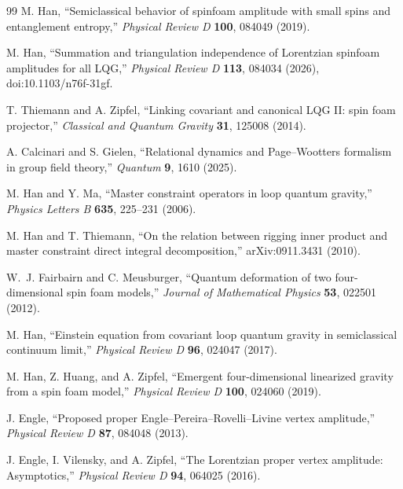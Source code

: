 \documentclass[11pt]{article}
\begin{document}
\begin{thebibliography}{99}
M. Han,
``Semiclassical behavior of spinfoam amplitude with small spins and entanglement entropy,''
\emph{Physical Review D} \textbf{100}, 084049 (2019).

M. Han,
``Summation and triangulation independence of Lorentzian spinfoam amplitudes for all LQG,''
\emph{Physical Review D} \textbf{113}, 084034 (2026),
doi:10.1103/n76f-31gf.

T. Thiemann and A. Zipfel,
``Linking covariant and canonical LQG II: spin foam projector,''
\emph{Classical and Quantum Gravity} \textbf{31}, 125008 (2014).

A. Calcinari and S. Gielen,
``Relational dynamics and Page--Wootters formalism in group field theory,''
\emph{Quantum} \textbf{9}, 1610 (2025).

M. Han and Y. Ma,
``Master constraint operators in loop quantum gravity,''
\emph{Physics Letters B} \textbf{635}, 225--231 (2006).

M. Han and T. Thiemann,
``On the relation between rigging inner product and master constraint direct integral decomposition,''
arXiv:0911.3431 (2010).

W.~J. Fairbairn and C. Meusburger,
``Quantum deformation of two four-dimensional spin foam models,''
\emph{Journal of Mathematical Physics} \textbf{53}, 022501 (2012).

M. Han,
``Einstein equation from covariant loop quantum gravity in semiclassical continuum limit,''
\emph{Physical Review D} \textbf{96}, 024047 (2017).

M. Han, Z. Huang, and A. Zipfel,
``Emergent four-dimensional linearized gravity from a spin foam model,''
\emph{Physical Review D} \textbf{100}, 024060 (2019).

J. Engle,
``Proposed proper Engle--Pereira--Rovelli--Livine vertex amplitude,''
\emph{Physical Review D} \textbf{87}, 084048 (2013).

J. Engle, I. Vilensky, and A. Zipfel,
``The Lorentzian proper vertex amplitude: Asymptotics,''
\emph{Physical Review D} \textbf{94}, 064025 (2016).


\end{thebibliography}
\end{document}
